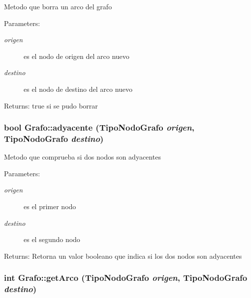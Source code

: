Metodo que borra un arco del grafo \begin{Desc}
\item[Parameters:]
\begin{description}
\item[{\em origen}]es el nodo de origen del arco nuevo \item[{\em destino}]es el nodo de destino del arco nuevo \end{description}
\end{Desc}
\begin{Desc}
\item[Returns:]true si se pudo borrar \end{Desc}
\hypertarget{classGrafo_23ead320b4f7eb49a8b470d998ed37c2}{
\subsubsection[adyacente]{\setlength{\rightskip}{0pt plus 5cm}bool Grafo::adyacente (TipoNodoGrafo {\em origen}, \/  TipoNodoGrafo {\em destino})}}
\label{classGrafo_23ead320b4f7eb49a8b470d998ed37c2}


Metodo que comprueba si dos nodos son adyacentes \begin{Desc}
\item[Parameters:]
\begin{description}
\item[{\em origen}]es el primer nodo \item[{\em destino}]es el segundo nodo \end{description}
\end{Desc}
\begin{Desc}
\item[Returns:]Retorna un valor booleano que indica si los dos nodos son adyacentes \end{Desc}
\hypertarget{classGrafo_f657b527f15fdc5c743b1dd1bf965789}{
\subsubsection[getArco]{\setlength{\rightskip}{0pt plus 5cm}int Grafo::getArco (TipoNodoGrafo {\em origen}, \/  TipoNodoGrafo {\em destino})}}
\label{classGrafo_f657b527f15fdc5c743b1dd1bf965789}


